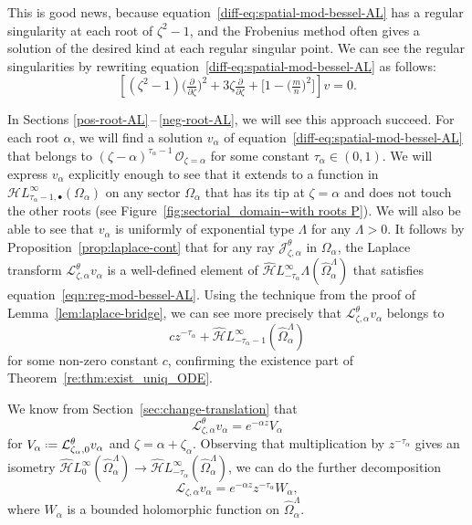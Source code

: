 \documentclass{article}
\newcommand{\singexp}[2]{\mathcal{H}L^\infty_{#1, #2}}
\newcommand{\singexpalg}[1]{\singexp{#1}{\bullet}}
\newcommand{\dualsingexp}[1]{\widehat{\mathcal{H}}L^\infty_{#1}}
\newcommand*{\defeq}{\mathrel{\vcenter{\baselineskip0.5ex \lineskiplimit0pt
                     \hbox{\scriptsize.}\hbox{\scriptsize.}}}%
                     =}
\newcommand{\laplace}{\mathcal{L}}
\theoremstyle{definition}
\theoremstyle{plain}
\begin{document}
This is good news, because equation~\eqref{diff-eq:spatial-mod-bessel-AL} has a regular singularity at each root of $\zeta^2 - 1$, and the Frobenius method often gives a solution of the desired kind at each regular singular point. We can see the regular singularities by rewriting equation~\eqref{diff-eq:spatial-mod-bessel-AL} as follows:
\[ \left[ (\zeta^2 - 1) \big(\tfrac{\partial}{\partial \zeta}\big)^2 + 3\zeta \tfrac{\partial}{\partial \zeta} + \big[ 1 - \big(\tfrac{m}{n}\big)^2 \big] \right] v = 0. \]

In Sections \ref{pos-root-AL}\,--\,\ref{neg-root-AL}, we will see this approach succeed. For each root $\alpha$, we will find a solution $v_\alpha$ of equation~\eqref{diff-eq:spatial-mod-bessel-AL} that belongs to $(\zeta - \alpha)^{\tau_\alpha-1}\,\mathcal{O}_{\zeta = \alpha}$ for some constant $\tau_\alpha \in (0, 1)$. We will express $v_\alpha$ explicitly enough to see that it extends to a function in $\singexpalg{\tau_\alpha-1}(\Omega_\alpha)$ on any sector $\Omega_\alpha$ that has its tip at $\zeta = \alpha$ and does not touch the other roots (see Figure~\ref{fig:sectorial_domain--with roots P}). We will also be able to see that $v_\alpha$ is uniformly of exponential type $\Lambda$ for any $\Lambda > 0$. It follows by Proposition~\ref{prop:laplace-cont} that for any ray $\mathcal{J}^\theta_{\zeta, \alpha}$ in $\Omega_\alpha$, the Laplace transform $\laplace^\theta_{\zeta, \alpha} v_\alpha$ is a well-defined element of $\dualsingexp{-\tau_\alpha}{\Lambda}(\widehat{\Omega}_\alpha^\Lambda)$ that satisfies equation~\eqref{eqn:reg-mod-bessel-AL}. Using the technique from the proof of Lemma~\ref{lem:laplace-bridge}, we can see more precisely that $\laplace^\theta_{\zeta, \alpha} v_\alpha$ belongs to
\[ cz^{-\tau_\alpha} + \dualsingexp{-\tau_\alpha-1}(\widehat{\Omega}_\alpha^\Lambda) \]
for some non-zero constant $c$, confirming the existence part of Theorem~\ref{re:thm:exist_uniq_ODE}.

We know from Section~\ref{sec:change-translation} that
\[ \laplace^\theta_{\zeta, \alpha} v_\alpha = e^{-\alpha z} V_\alpha \]
for $V_\alpha \defeq \laplace^\theta_{\zeta_\alpha, 0} v_\alpha$ and $\zeta = \alpha + \zeta_\alpha$. Observing that multiplication by $z^{-\tau_\alpha}$ gives an isometry $\dualsingexp{0}(\widehat{\Omega}_\alpha^\Lambda) \to \dualsingexp{-\tau_\alpha}(\widehat{\Omega}_\alpha^\Lambda)$, we can do the further decomposition
\[ \laplace_{\zeta, \alpha} v_\alpha = e^{-\alpha z} z^{-\tau_\alpha} W_\alpha, \]
where $W_\alpha$ is a bounded holomorphic function on $\widehat{\Omega}_\alpha^\Lambda$.
%
\end{document}
